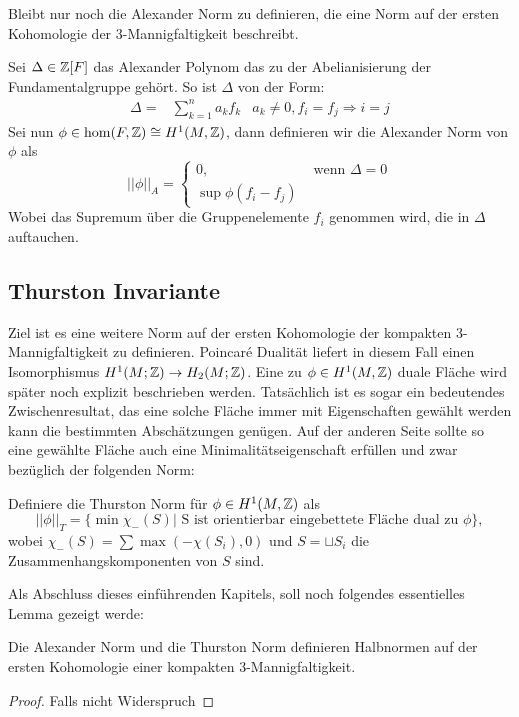     	Bleibt nur noch die Alexander Norm zu definieren, die eine Norm auf der ersten Kohomologie der 3-Mannigfaltigkeit beschreibt.
    	\begin{defn}
    		Sei  $\Delta \in \mathbb{Z} [F]$ das Alexander Polynom das zu der Abelianisierung der Fundamentalgruppe gehört. So ist $\Delta$ von der Form:
    		\begin{align*}
    		    			\Delta = &\sum_{k=1}^n a_k f_k& a_k \neq 0, f_i = f_j \Rightarrow i=j
    		\end{align*}
    		Sei nun $\phi \in \hom (F,\mathbb{Z}) \cong H^1 (M,\mathbb{Z})$, dann definieren wir die Alexander Norm von $\phi$ als
    		\[
    			||\phi||_A = \begin{cases}
    				0 , &\text{ wenn } \Delta=0\\
    				\sup \phi (f_i - f_j) &
    			\end{cases}
    		\]
    		Wobei das Supremum über die Gruppenelemente $f_i$ genommen wird, die in $\Delta$ auftauchen.

    	\end{defn}

    \subsection{Thurston Invariante}
        Ziel ist es eine weitere Norm auf der ersten Kohomologie der kompakten 3-Mannigfaltigkeit zu definieren. Poincaré Dualität liefert in diesem Fall einen Isomorphismus $H^1(M;\mathbb{Z}) \to H_2(M;\mathbb{Z})$. Eine zu $\phi \in H^1(M,\mathbb{Z})$ duale Fläche wird später noch explizit beschrieben werden. Tatsächlich ist es sogar ein bedeutendes Zwischenresultat, das eine solche Fläche immer mit Eigenschaften gewählt werden kann die bestimmten Abschätzungen genügen. Auf der anderen Seite sollte so eine gewählte Fläche auch eine Minimalitätseigenschaft erfüllen und zwar bezüglich der folgenden Norm:
        \begin{defn}
        	Definiere die Thurston Norm für $\phi \in H^1(M,\mathbb{Z})$ als
        	\[
        	        		||\phi||_T = \{\min \chi_-(S)| \text{ S ist orientierbar eingebettete Fläche dual zu } \phi \},
        	        	\]        	
        	wobei $\chi_-(S)=\sum \max (-\chi(S_i),0)$  und $S=\sqcup S_i$ die Zusammenhangskomponenten von $S$ sind.
        \end{defn}


        Als Abschluss dieses einführenden Kapitels, soll noch folgendes essentielles Lemma gezeigt werde:
        \begin{lem}
        	Die Alexander Norm und die Thurston Norm definieren Halbnormen auf der ersten Kohomologie einer kompakten 3-Mannigfaltigkeit. 
        \end{lem}
        \begin{proof}
        	Falls nicht Widerspruch
        \end{proof}